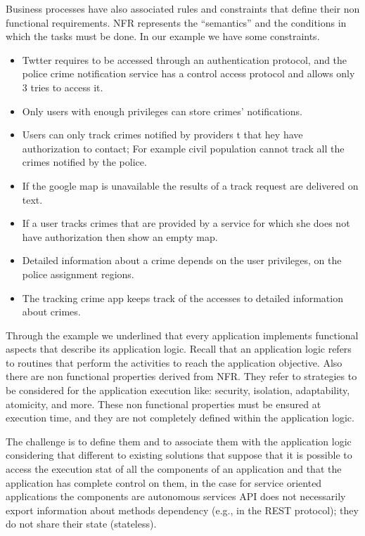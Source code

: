 Business processes have also associated rules and constraints that define their non functional requirements.  
NFR represents the “semantics” and the conditions in which the tasks must be done. 
In our example we have some constraints. 
\begin{itemize}
\item Twtter requires to be accessed through an authentication protocol, and the police crime notification service has a control  access protocol and allows only 3 tries to access it. 
\item Only users with enough privileges can store crimes’ notifications. 
\item Users can only track crimes notified by providers t that hey have authorization to contact; For example civil population cannot track all the crimes notified by the police. 
\item If the google map is unavailable the results of a track request are delivered on text. 
\item If a user tracks crimes that are provided by a service for which she does not have authorization then show an empty map. 
\item Detailed information about a crime depends on the user privileges, on the police assignment regions. 
\item The tracking crime app keeps track of the accesses to detailed information about crimes. 
\end{itemize}

Through the example we underlined that every application implements functional aspects that describe its application logic. Recall that an application logic refers to routines that perform the activities to reach the application objective.
Also there are non functional properties derived from NFR. They refer to strategies to be considered for the application execution like: security, isolation, adaptability, atomicity, and more.
These non functional properties must be ensured at execution time, and they are not completely defined within the application logic.

The challenge is to define them and to associate them with the application logic considering that different to existing solutions that suppose that it is possible to access the execution stat of all the components  of an application and that the application has complete control on them, in the case for service oriented applications  the components are autonomous services
API does not necessarily export information about methods dependency (e.g., in the REST protocol);
they do not share their state (stateless).



